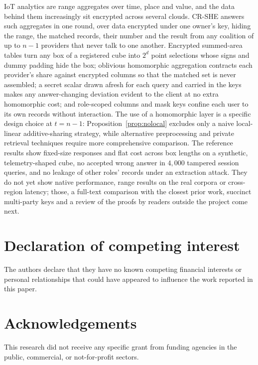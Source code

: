 \documentclass[a4paper,fleqn]{cas-sc}
\newif\ifanonymous
\begin{document}
IoT analytics are range aggregates over time, place and value, and the data
behind them increasingly sit encrypted across several clouds. CR-SHE answers
such aggregates in one round, over data encrypted under one owner's key,
hiding the range, the matched records, their number and the result from any
coalition of up to $n-1$ providers that never talk to one another. Encrypted
summed-area tables turn any box of a registered cube into $2^d$ point
selections whose signs and dummy padding hide the box; oblivious homomorphic
aggregation contracts each provider's share against encrypted columns so that
the matched set is never assembled; a secret scalar drawn afresh for each query
and carried in the keys makes any answer-changing deviation evident to the
client at no extra homomorphic cost; and role-scoped columns and mask keys
confine each user to its own records without interaction. The use of a homomorphic layer is a specific design choice at $t=n-1$:
Proposition~\ref{prop:nolocal} excludes only a naive local-linear
additive-sharing strategy, while alternative preprocessing and private
retrieval techniques require more comprehensive comparison. The reference results
show fixed-size responses and flat cost across box lengths on a synthetic,
telemetry-shaped cube, no accepted wrong answer in $4{,}000$ tampered session
queries, and no leakage of other roles' records under an extraction attack.
They do not yet show native performance, range results on the real corpora or
cross-region latency; those, a full-text comparison with the closest prior
work, succinct multi-party keys and a review of the proofs by readers outside
the project come next.

\ifanonymous\else\printcredits\fi

\section*{Declaration of competing interest}
The authors declare that they have no known competing financial interests or
personal relationships that could have appeared to influence the work reported
in this paper.

\section*{Acknowledgements}
This research did not receive any specific grant from funding agencies in the
public, commercial, or not-for-profit sectors.
\end{document}
